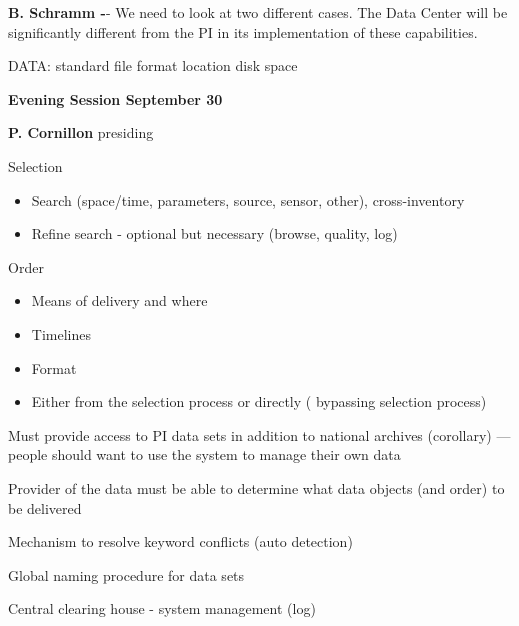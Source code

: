 \begin{description}
\smallskip
{\bf B. Schramm -}- We need to look at two different cases.  The Data Center 
will be significantly different from the PI in its implementation of these 
capabilities.  


DATA:	standard file format \quad\quad location \quad\quad disk space

\Large
\begin{center}
{\bf Evening Session September 30}
\end{center}
\normalsize
\smallskip
{\bf P. Cornillon} presiding 

\begin{description} 
	\item{} Selection
	   \begin{itemize} 
		\item Search (space/time, parameters, source, sensor, other),
cross-inventory  
		\item Refine search - optional but necessary (browse,
quality, log) 
	   \end{itemize}
	\item {} Order 
	   \begin{itemize}
		\item Means of delivery and where
		\item Timelines
		\item Format
		\item Either from the selection process or directly (
bypassing selection process)	  
	   \end{itemize}
	   \begin{description}
		\item Must provide access to PI data sets in addition to
national archives (corollary) --- people should want to use the system to
manage their own data
	   \end{description}
\end{description}

\begin{description}
	\item{} Provider of the data must be able to determine what data
objects (and order) to be delivered

	\item{} Mechanism  to resolve keyword conflicts (auto detection)

	\item{} Global naming procedure for data sets

	\item{} Central clearing house - system management (log)


\end{description}
\end{description}
